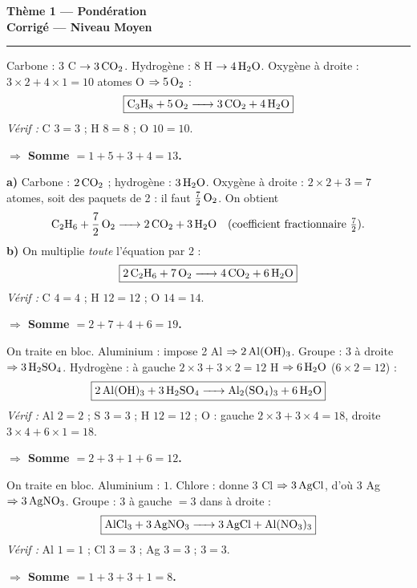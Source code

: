 \documentclass[11pt,a4paper]{article}
\newcommand{\rep}[1]{\par\smallskip\noindent\textbf{\color{corrcol}$\Rightarrow$ #1}}
\begin{document}
\begin{center}
{\LARGE\bfseries\color{primarydark}Thème 1 — Pondération}\\[1pt]
{\large\color{corrcol}\textbf{Corrigé — Niveau Moyen}}\\
{\color{primary}\rule{0.6\linewidth}{1pt}}
\end{center}

\begin{cor}
Carbone : $3$ C $\to 3\,\ce{CO2}$. Hydrogène : $8$ H $\to 4\,\ce{H2O}$.
Oxygène à droite : $3\times2+4\times1=10$ atomes O $\Rightarrow 5\,\ce{O2}$ :
\[ \boxed{\ce{C3H8 + 5 O2 -> 3 CO2 + 4 H2O}} \]
\emph{Vérif :} C $3=3$ ; H $8=8$ ; O $10=10$. \checkmark
\rep{Somme $=1+5+3+4=\boxed{13}$.}
\end{cor}

\begin{cor}
\textbf{a)} Carbone : $2\,\ce{CO2}$ ; hydrogène : $3\,\ce{H2O}$. Oxygène à droite :
$2\times2+3=7$ atomes, soit des paquets de 2 : il faut $\tfrac{7}{2}\,\ce{O2}$. On obtient
\[ \ce{C2H6 + 7/2 O2 -> 2 CO2 + 3 H2O}\quad(\text{coefficient fractionnaire } \tfrac{7}{2}). \]
\textbf{b)} On multiplie \emph{toute} l'équation par $2$ :
\[ \boxed{\ce{2 C2H6 + 7 O2 -> 4 CO2 + 6 H2O}} \]
\emph{Vérif :} C $4=4$ ; H $12=12$ ; O $14=14$. \checkmark
\rep{Somme $=2+7+4+6=\boxed{19}$.}
\end{cor}

\begin{cor}
On traite  en bloc. Aluminium :  impose 2 Al $\Rightarrow 2\,\ce{Al(OH)3}$.
Groupe  : 3 à droite $\Rightarrow 3\,\ce{H2SO4}$. Hydrogène : à gauche
$2\times3+3\times2=12$ H $\Rightarrow 6\,\ce{H2O}$ ($6\times2=12$) :
\[ \boxed{\ce{2 Al(OH)3 + 3 H2SO4 -> Al2(SO4)3 + 6 H2O}} \]
\emph{Vérif :} Al $2=2$ ; S $3=3$ ; H $12=12$ ; O : gauche $2\times3+3\times4=18$, droite
$3\times4+6\times1=18$. \checkmark
\rep{Somme $=2+3+1+6=\boxed{12}$.}
\end{cor}

\begin{cor}
On traite  en bloc. Aluminium : $1$. Chlore :  donne 3 Cl $\Rightarrow 3\,\ce{AgCl}$,
d'où 3 Ag $\Rightarrow 3\,\ce{AgNO3}$. Groupe  : $3$ à gauche $=3$ dans  à droite :
\[ \boxed{\ce{AlCl3 + 3 AgNO3 -> 3 AgCl + Al(NO3)3}} \]
\emph{Vérif :} Al $1=1$ ; Cl $3=3$ ; Ag $3=3$ ;  $3=3$. \checkmark
\rep{Somme $=1+3+3+1=\boxed{8}$.}
\end{cor}
\end{document}
